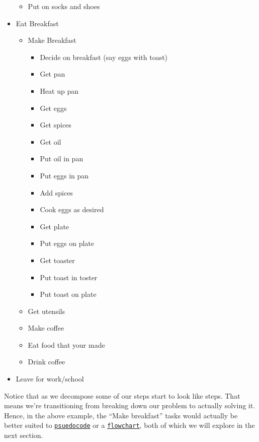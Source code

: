 \documentclass[12pt,a4paper]{book}
\begin{document}
\begin{itemize}
\begin{itemize}
						\item Put on socks and shoes
					\end{itemize}	
				\item Eat Breakfast
					\begin{itemize}
						\item Make Breakfast
							\begin{itemize}
								\item Decide on breakfast (say eggs with toast)
								\item Get pan
								\item Heat up pan
								\item Get eggs
								\item Get spices
								\item Get oil
								\item Put oil in pan
								\item Put eggs in pan
								\item Add spices
								\item Cook eggs as desired
								\item Get plate
								\item Put eggs on plate
								\item Get toaster
								\item Put toast in toster
								\item Put toast on plate
							\end{itemize}
						\item Get utensils
						\item Make coffee
						\item Eat food that your made
						\item Drink coffee
					\end{itemize}
				\item Leave for work/school
			\end{itemize}

			Notice that as we decompose some of our steps start to look like steps. That means we're transitioning from breaking down our problem to actually solving it. Hence, in the above example, the ``Make breakfast'' tasks would actually be better suited to \hyperref[sec:psuedocode]{\texttt{psuedocode}} or a \hyperref[sec:flowchart]{\texttt{flowchart}}, both of which we will explore in the next section.
\end{document}
